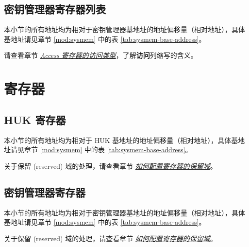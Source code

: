\documentclass[main\_\_CN.tex]{subfiles}
\begin{document}



\subsection{密钥管理器寄存器列表}
本小节的所有地址均为相对于密钥管理器基地址的地址偏移量（相对地址），具体基地址请见章节  \ref{mod:sysmem} \textit{} 中的表  \ref{tab:sysmem-base-address}。

请查看章节  \hyperref[glossary-access-types]{\textit{Access 寄存器的访问类型}}，了解\textbf{访问}列缩写的含义。



\section{寄存器}

\subsection{HUK 寄存器}
本小节的所有地址均为相对于 HUK 基地址的地址偏移量（相对地址），具体基地址请见章节  \ref{mod:sysmem} \textit{} 中的表  \ref{tab:sysmem-base-address}。


关于保留 (reserved) 域的处理，请查看章节 \hyperref[programming-reserved-field]{\textit{如何配置寄存器的保留域}}。



\subsection{密钥管理器寄存器}
本小节的所有地址均为相对于密钥管理器基地址的地址偏移量（相对地址），具体基地址请见章节  \ref{mod:sysmem} \textit{} 中的表  \ref{tab:sysmem-base-address}。


关于保留 (reserved) 域的处理，请查看章节 \hyperref[programming-reserved-field]{\textit{如何配置寄存器的保留域}}。


\end{document}
